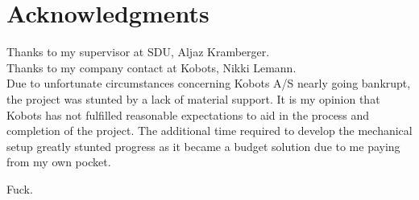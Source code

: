 \section*{Acknowledgments}

Thanks to my supervisor at SDU, Aljaz Kramberger.\\
Thanks to my company contact at Kobots, Nikki Lemann.\\

Due to unfortunate circumstances concerning Kobots A/S nearly going bankrupt, the project was stunted by a lack of material support.
It is my opinion that Kobots has not fulfilled reasonable expectations to aid in the process and completion of the project. 
The additional time required to develop the mechanical setup greatly stunted progress as it became a budget solution due to me paying from my own pocket.

Fuck. 
